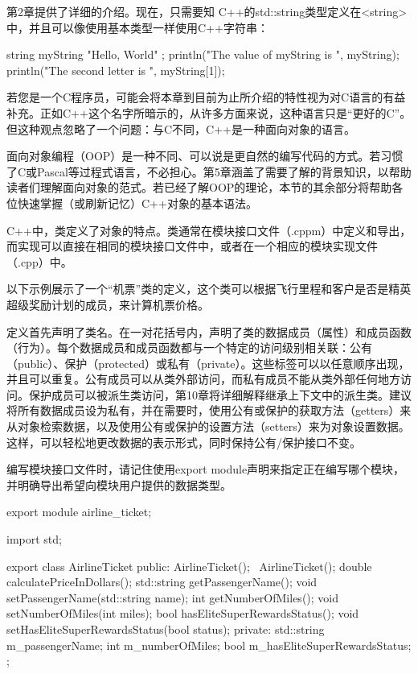 第2章提供了详细的介绍。现在，只需要知 C++的std::string类型定义在<string>中，并且可以像使用基本类型一样使用C++字符串：

\begin{cpp}
string myString { "Hello, World" };
println("The value of myString is {}", myString);
println("The second letter is {}", myString[1]);
\end{cpp}


若您是一个C程序员，可能会将本章到目前为止所介绍的特性视为对C语言的有益补充。正如C++这个名字所暗示的，从许多方面来说，这种语言只是“更好的C”。但这种观点忽略了一个问题：与C不同，C++是一种面向对象的语言。

面向对象编程（OOP）是一种不同、可以说是更自然的编写代码的方式。若习惯了C或Pascal等过程式语言，不必担心。第5章涵盖了需要了解的背景知识，以帮助读者们理解面向对象的范式。若已经了解OOP的理论，本节的其余部分将帮助各位快速掌握（或刷新记忆）C++对象的基本语法。


C++中，类定义了对象的特点。类通常在模块接口文件（.cppm）中定义和导出，而实现可以直接在相同的模块接口文件中，或者在一个相应的模块实现文件（.cpp）中。

以下示例展示了一个“机票”类的定义，这个类可以根据飞行里程和客户是否是精英超级奖励计划的成员，来计算机票价格。

定义首先声明了类名。在一对花括号内，声明了类的数据成员（属性）和成员函数（行为）。每个数据成员和成员函数都与一个特定的访问级别相关联：公有（public）、保护（protected）或私有（private）。这些标签可以以任意顺序出现，并且可以重复。公有成员可以从类外部访问，而私有成员不能从类外部任何地方访问。保护成员可以被派生类访问，第10章将详细解释继承上下文中的派生类。建议将所有数据成员设为私有，并在需要时，使用公有或保护的获取方法（getters）来从对象检索数据，以及使用公有或保护的设置方法（setters）来为对象设置数据。这样，可以轻松地更改数据的表示形式，同时保持公有/保护接口不变。

编写模块接口文件时，请记住使用export module声明来指定正在编写哪个模块，并明确导出希望向模块用户提供的数据类型。

\begin{cpp}
export module airline_ticket;

import std;

export class AirlineTicket
{
    public:
        AirlineTicket();
        ~AirlineTicket();
        double calculatePriceInDollars();
        std::string getPassengerName();
        void setPassengerName(std::string name);
        int getNumberOfMiles();
        void setNumberOfMiles(int miles);
        bool hasEliteSuperRewardsStatus();
        void setHasEliteSuperRewardsStatus(bool status);
    private:
        std::string m_passengerName;
        int m_numberOfMiles;
        bool m_hasEliteSuperRewardsStatus;
};
\end{cpp}

